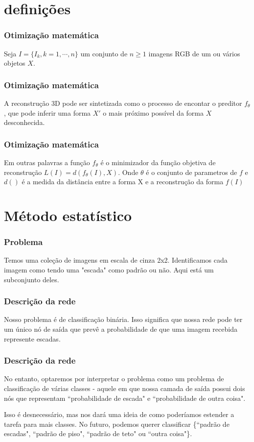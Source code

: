 \section{definições}

\begin{frame}
\frametitle{Otimização matemática}



Seja $I = \{I_{k}, k = 1, \cdots, n\}$ um conjunto
de $ n \geq 1 $ imagens RGB de um ou vários objetos $X$.
\end{frame}


\begin{frame}
\frametitle{Otimização matemática}
A reconstrução 3D pode ser sintetizada como o processo de encontar o preditor
$f_\theta$, que pode inferir uma forma $X'$ o mais próximo possível da forma
$X$ desconhecida.
\end{frame}

\begin{frame}
\frametitle{Otimização matemática}
Em outras palavras a função $f_\theta$ é o minimizador da função objetiva de
    reconstrução $L(I)=d(f_{\theta}(I), X)$. Onde $\theta$ é o conjunto de
    parametros de $f$ e $d()$ é a medida da distância entre a forma X e a
    reconstrução da forma $f(I)$

\end{frame}


\section{Método estatístico}

\begin{frame}
\frametitle{Problema}

Temos uma coleção de imagens em escala de cinza 2x2. Identificamos cada imagem
    como tendo uma "escada" como padrão ou não. Aqui está um subconjunto
    deles.
\end{frame}



\begin{frame}
\frametitle{Descrição da rede}

Nosso problema é de classificação binária. Isso significa que nossa rede pode
    ter um único nó de saída que prevê a probabilidade de que uma imagem
    recebida represente escadas.
\end{frame}

\begin{frame}
\frametitle{Descrição da rede}

No entanto, optaremos por interpretar o problema como um problema de
    classificação de várias classes - aquele em que nossa camada de saída
    possui dois nós que representam ``probabilidade de escada" e
    ``probabilidade de outra coisa".

Isso é desnecessário, mas nos dará uma ideia de como poderíamos estender a
    tarefa para mais classes.  No futuro, podemos querer classificar
    \{``padrão de escadas", ``padrão de piso", ``padrão de teto" ou ``outra
    coisa"\}.
\end{frame}

